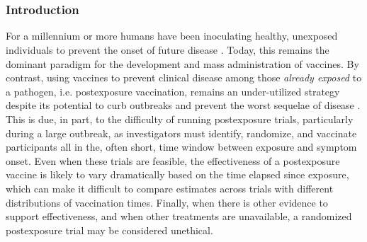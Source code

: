 \documentclass[11pt]{article}
\begin{document}
\part{} %

\section{Introduction} \label{sec:introduction}
For a millennium or more humans have been inoculating healthy, unexposed individuals to prevent the onset of future disease \cite{plotkin2012vaccines}. Today, this remains the dominant paradigm for the development and mass administration of vaccines. By contrast, using vaccines to prevent clinical disease among those \textit{already exposed} to a pathogen, i.e. postexposure vaccination, remains an under-utilized strategy despite its potential to curb outbreaks and prevent the worst sequelae of disease \cite{gallagher_postexposure_2019}. This is due, in part, to the difficulty of running postexposure trials, particularly during a large outbreak, as investigators must identify, randomize, and vaccinate participants all in the, often short, time window between exposure and symptom onset. Even when these trials are feasible, the effectiveness of a postexposure vaccine is likely to vary dramatically based on the time elapsed since exposure, which can make it difficult to compare estimates across trials with different distributions of vaccination times. Finally, when there is other evidence to support effectiveness, and when other treatments are unavailable, a randomized postexposure trial may be considered unethical.
\end{document}
